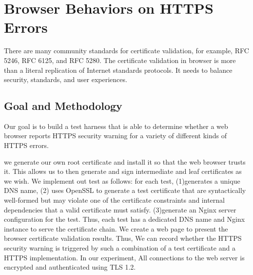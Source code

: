 \section{Browser Behaviors on HTTPS Errors}
There are many community standards for certificate validation,
    for example,
    RFC 5246, RFC 6125, and RFC 5280.
    The certificate validation in browser
    is more than a  literal replication of Internet standards protocols.
    It needs to balance security, standards, and user experiences.
\subsection{Goal and Methodology}
Our goal is to build a test harness that is able to determine whether a web browser reports HTTPS security warning for a variety of different kinds of HTTPS errors.

we generate our own root certificate and install it so that the web browser trusts it.
    This allows us to then generate and sign intermediate and leaf certificates as we wish.
We implement out test as follows: for each test,
    (1)generates a unique DNS name,
    (2) uses OpenSSL to generate a test certificate that are syntactically well-formed but may violate one of the certificate constraints and internal dependencies that a valid certificate must satisfy.
    (3)generate an Nginx server configuration for the test.
Thus, each test has a dedicated DNS name and Nginx instance to serve the certificate chain.
    We create a web page to present the browser certificate validation results.
    Thus, We can record whether the HTTPS security warning is triggered by such a combination of a test certificate and a HTTPS implementation.
    In our experiment, All connections to the web server is encrypted and authenticated using TLS 1.2.

